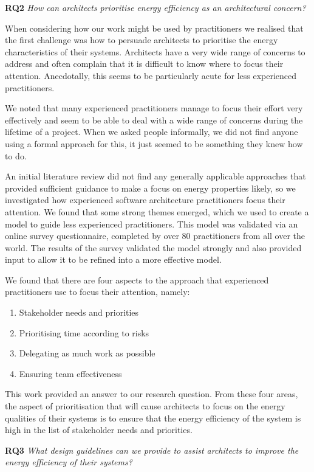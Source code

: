 \textbf{RQ2} \emph{How can architects prioritise energy efficiency as an architectural concern?}

When considering how our work might be used by practitioners we realised that the first challenge was how to persuade architects to prioritise the energy characteristics of their systems.  Architects have a very wide range of concerns to address and often complain that it is difficult to know where to focus their attention.  Anecdotally, this seems to be particularly acute for less experienced practitioners.

We noted that many experienced practitioners manage to focus their effort very effectively and seem to be able to deal with a wide range of concerns during the lifetime of a project.  When we asked people informally, we did not find anyone using a formal approach for this, it just seemed to be something they knew how to do.

An initial literature review did not find any generally applicable approaches that provided sufficient guidance to make a focus on energy properties likely, so we investigated how experienced software architecture practitioners focus their attention.  We found that some strong themes emerged, which we used to create a model to guide less experienced practitioners.  This model was validated via an online survey questionnaire, completed by over 80 practitioners from all over the world.  The results of the survey validated the model strongly and also provided input to allow it to be refined into a more effective model.

We found that there are four aspects to the approach that experienced practitioners use to focus their attention, namely:
\begin{enumerate}
	\item Stakeholder needs and priorities
	\item Prioritising time according to risks
	\item Delegating as much work as possible
	\item Ensuring team effectiveness
\end{enumerate}

This work provided an answer to our research question.  From these four areas, the aspect of prioritisation that will cause architects to focus on the energy qualities of their systems is to ensure that the energy efficiency of the system is high in the list of stakeholder needs and priorities.

\textbf{RQ3} \emph{What design guidelines can we provide to assist architects to improve the energy efficiency of their systems?}


